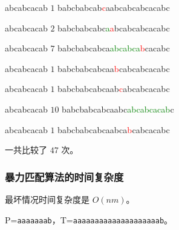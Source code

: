 \documentclass{ctexbeamer}
\newcommand{\red}[1]{\textcolor{red}{#1}}
\newcommand{\green}[1]{\textcolor{green}{#1}}
\begin{document}
\begin{frame}[fragile]
\begin{minipage}[t]{.5\textwidth}
\begin{tverb}[frame=bottomline, fontsize=\small]
          abcabcacab \(1\)
babcbabcab\red{c}aabcabcabcacabc
\end{tverb}

\begin{tverb}[frame=bottomline, fontsize=\small]
           abcabcacab \(2\)
babcbabcabc\green{a}\red{a}bcabcabcacabc
    	\end{tverb}

\begin{tverb}[frame=bottomline, fontsize=\small]
            abcabcacab \(7\)
babcbabcabca\green{abcabca}\red{b}cacabc
            	\end{tverb}

\begin{tverb}[frame=bottomline, fontsize=\small]
             abcabcacab \(1\)
babcbabcabcaa\red{b}cabcabcacabc
\end{tverb}

\begin{tverb}[frame=bottomline, fontsize=\small]
              abcabcacab \(1\)
babcbabcabcaab\red{c}abcabcacabc
            	\end{tverb}

\begin{tverb}[frame=bottomline, fontsize=\small]
               abcabcacab \(10\)
babcbabcabcaabc\green{abcabcacab}c
\end{tverb}

\begin{tverb}[frame=bottomline, fontsize=\small]
                abcabcacab \(1\)
babcbabcabcaabca\red{b}cabcacabc
\end{tverb}


\end{minipage}



一共比较了 $47$ 次。

\end{frame}

\begin{frame}
	\frametitle{暴力匹配算法的时间复杂度}

最坏情况时间复杂度是 $O(nm)$。


P=\texttt{aaaaaaab}，T=\texttt{aaaaaaaaaaaaaaaaaaaab}。
\end{frame}
\end{document}
